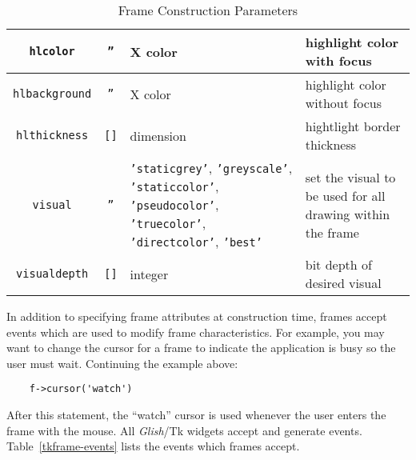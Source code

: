 \begin{table}[tbh]
{\begin{center}
\begin{tabular}{|c|c|p{1.7in}|p{1.8in}|}
{\tt hlcolor}		& {\tt ''}	& X color & highlight color with focus \\ \hline
{\tt hlbackground}	& {\tt ''}	& X color & highlight color without focus \\ \hline
{\tt hlthickness}	& {\tt []}	& dimension & hightlight border thickness \\ \hline
{\tt visual}		& {\tt ''}	& {\tt 'staticgrey'}, {\tt 'greyscale'}, {\tt 'staticcolor'}, {\tt 'pseudocolor'}, {\tt 'truecolor'}, {\tt 'directcolor'}, {\tt 'best'}\footnotemark & set the visual to be used for all drawing within the frame \\ \hline
{\tt visualdepth}	& {\tt []}	& integer & bit depth of desired visual \\ \hline
\end{tabular}
\end{center}
}
\caption{ Frame Construction Parameters }
\label{tkframe-params}
\end{table}

In addition to specifying frame attributes at construction time, frames accept
events which are used to modify frame characteristics. For example,
you may want to change the cursor for a frame to indicate the  
application is busy so the user must wait.  
Continuing the example above:
\begin{verbatim}
    f->cursor('watch')
\end{verbatim}
After this statement, the ``watch'' cursor is  used whenever the user
enters the frame with the mouse. All {\em Glish}/Tk widgets accept and generate
events. Table~\ref{tkframe-events} lists the events which frames accept.

